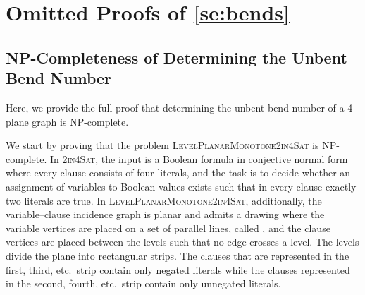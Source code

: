 \documentclass[runningheads]{llncs}
\let\emph\relax\DeclareTextFontCommand{\emph}{\color{dark blue}\em}
\begin{document}
\section{Omitted Proofs of \cref{se:bends}}

\subsection{NP-Completeness of Determining the Unbent Bend Number}

Here, we provide the full proof that determining the unbent bend number
of a 4-plane graph is NP-complete.

We start by proving that the problem \textsc{LevelPlanarMonotone2in4Sat} is NP-complete.
In \textsc{2in4Sat}, the input is a Boolean formula in conjective normal form where every clause consists of four literals, 
and the task is to decide whether an assignment of variables to Boolean values
exists such that in every clause exactly two literals are true.
In \textsc{LevelPlanarMonotone2in4Sat}, additionally, the variable--clause incidence graph is planar and admits a drawing where the variable vertices are
placed on a set of parallel lines, called \emph{levels}, and the clause vertices are
placed between the levels such that no edge crosses a level.
The levels divide the plane into rectangular strips.
The clauses that are represented in the first, third, etc.\ strip contain only negated literals while
the clauses represented in the second, fourth, etc.\ strip contain only unnegated literals.

\LevelTwoInFourSAT*
\label{lm:level2in4satNPh*}
\end{document}
